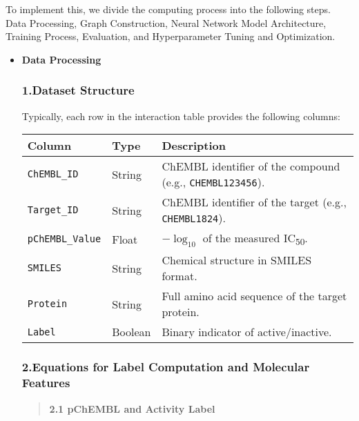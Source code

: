 \documentclass[fontsize=11pt]{article}
\begin{document}
To implement this, we divide the computing process into the following steps. Data Processing, Graph Construction, Neural Network Model Architecture, Training Process, Evaluation, and Hyperparameter Tuning and Optimization.
\begin{itemize}
    \item \textbf{Data Processing} \subsubsection*{1.\quad Dataset Structure}
Typically, each row in the interaction table provides the following columns:

\begin{center}
\begin{tabular}{|l|l|p{9cm}|}
\hline
\textbf{Column}       & \textbf{Type}    & \textbf{Description} \\
\hline
\texttt{ChEMBL\_ID} & String           & ChEMBL identifier of the compound (e.g., \texttt{CHEMBL123456}). \\
\texttt{Target\_ID}   & String           & ChEMBL identifier of the target (e.g., \texttt{CHEMBL1824}). \\
\texttt{pChEMBL\_Value} & Float         & $-\log_{10}$ of the measured IC\textsubscript{50}. \\
\texttt{SMILES}       & String           & Chemical structure in SMILES format. \\
\texttt{Protein}    & String            & Full amino acid sequence of the target protein. \\
\texttt{Label} & Boolean & Binary indicator of active/inactive. \\ %
\hline
\end{tabular}
\end{center}


\subsubsection*{2.\quad Equations for Label Computation and Molecular Features}

\begin{quote}

    \textbf{2.1 pChEMBL and Activity Label}
    

\end{quote}
\end{itemize}
\end{document}
